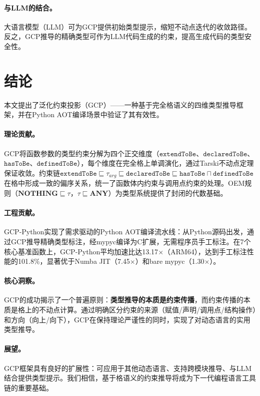 \documentclass[UTF8]{article}
\newcommand{\NOTHING}{\mathbf{NOTHING}}
\newcommand{\ANY}{\mathbf{ANY}}
\newcommand{\extendToBe}{\texttt{extendToBe}}
\newcommand{\declaredToBe}{\texttt{declaredToBe}}
\newcommand{\hasToBe}{\texttt{hasToBe}}
\newcommand{\definedToBe}{\texttt{definedToBe}}
\begin{document}
\paragraph{与LLM的结合。}
大语言模型（LLM）可为GCP提供初始类型提示，缩短不动点迭代的收敛路径。反之，GCP推导的精确类型可作为LLM代码生成的约束，提高生成代码的类型安全性。

\section{结论}

本文提出了泛化约束投影（GCP）——一种基于完全格语义的四维类型推导框架，并在Python AOT编译场景中验证了其有效性。

\paragraph{理论贡献。}
GCP将函数参数的类型约束分解为四个正交维度（$\extendToBe$、$\declaredToBe$、$\hasToBe$、$\definedToBe$），每个维度在完全格上单调演化，通过Tarski不动点定理保证收敛。约束链$\extendToBe \sqsubseteq \tau_{arg} \sqsubseteq \declaredToBe \sqsubseteq \hasToBe \sqcap \definedToBe$在格中形成一致的偏序关系，统一了函数体内约束与调用点约束的处理。OEM规则（$\NOTHING \sqsubseteq \tau$，$\tau \sqsubseteq \ANY$）为类型系统提供了封闭的代数基础。

\paragraph{工程贡献。}
GCP-Python实现了需求驱动的Python AOT编译流水线：从Python源码出发，通过GCP推导精确类型标注，经mypyc编译为C扩展，无需程序员手工标注。在7个核心基准函数上，GCP-Python平均加速比达13.17$\times$（ARM64），达到手工标注性能的101.8\%，显著优于Numba JIT（7.45$\times$）和bare mypyc（1.30$\times$）。

\paragraph{核心洞察。}
GCP的成功揭示了一个普遍原则：\textbf{类型推导的本质是约束传播}，而约束传播的本质是格上的不动点计算。通过明确区分约束的来源（赋值/声明/调用点/结构操作）和方向（向上/向下），GCP在保持理论严谨性的同时，实现了对动态语言的实用类型推导。

\paragraph{展望。}
GCP框架具有良好的扩展性：可应用于其他动态语言、支持跨模块推导、与LLM结合提供类型提示。我们相信，基于格语义的约束推导将成为下一代编程语言工具链的重要基础。
\end{document}
